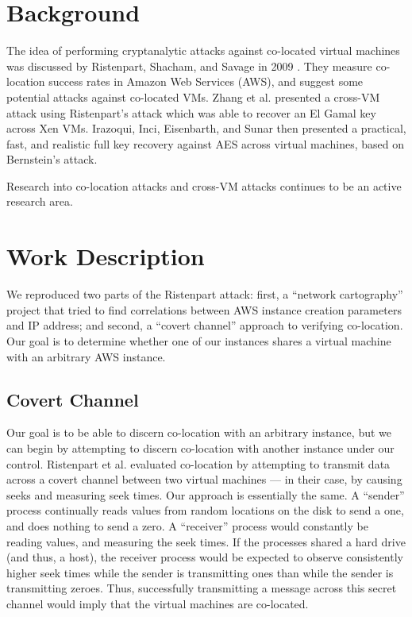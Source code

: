 \documentclass[conference]{IEEEtran}
\begin{document}
\section{Background}\label{sec:background}
The idea of performing cryptanalytic attacks against co-located virtual machines was discussed by Ristenpart, Shacham,
  and Savage in 2009 \cite{ristenpart09}.
They measure co-location success rates in Amazon Web Services (AWS), and suggest some potential attacks against
  co-located VMs.
Zhang \cite{zhang2014cross} et al. presented a cross-VM attack using Ristenpart's attack which was able to recover an El Gamal key across
Xen VMs.
Irazoqui, Inci, Eisenbarth, and Sunar \cite{irazoquis2014wait} then presented a practical, fast, and realistic full key
  recovery against AES across virtual machines, based on Bernstein's \cite{bernstein2005cache} attack.

Research into co-location attacks and cross-VM attacks continues to be an active research area.

\section{Work Description}
We reproduced two parts of the Ristenpart attack: first, a ``network cartography'' project that tried to find
  correlations between AWS instance creation parameters and IP address; and second, a ``covert channel'' approach to
  verifying co-location.
Our goal is to determine whether one of our instances shares a virtual machine with an arbitrary AWS instance.

\subsection{Covert Channel}
Our goal is to be able to discern co-location with an arbitrary instance, but we can begin by attempting to discern
  co-location with another instance under our control.
Ristenpart et al. evaluated co-location by attempting to transmit data across a covert channel between two virtual
  machines --- in their case, by causing seeks and measuring seek times. Our approach is essentially the same.
A ``sender'' process continually reads values from random locations on the disk to send a one, and does nothing to
  send a zero.
A ``receiver'' process would constantly be reading values, and measuring the seek times.
If the processes shared a hard drive (and thus, a host), the receiver process would be expected to observe consistently
  higher seek times while the sender is transmitting ones than while the sender is transmitting zeroes.
Thus, successfully transmitting a message across this secret channel would imply that the virtual machines are
  co-located.
\end{document}
